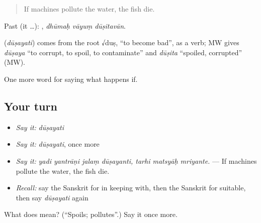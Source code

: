 \begin{quote}
If machines pollute the water, the fish die.
\end{quote}

Past (it …):   , \emph{dhūmaḥ vāyuṃ dūṣitavān}.

\begin{cousinweb}
\textbf{} (\emph{dūṣayati}) comes from the root √duṣ, \textquotedblleft{}to become bad\textquotedblright{}, as a verb; MW gives \emph{dūṣaya} \textquotedblleft{}to corrupt, to spoil, to contaminate\textquotedblright{} and \emph{dūṣita} \textquotedblleft{}spoiled, corrupted\textquotedblright{} (MW).
\end{cousinweb}

\begin{grammarlens}[title={What you've built}]
One more word for saying what happens if.
\end{grammarlens}

\subsection*{Your turn}
\begin{itemize}
\raggedright
  \item \emph{Say it:} \emph{dūṣayati}
  \item \emph{Say it:} \emph{dūṣayati}, once more
  \item \emph{Say it:} \emph{yadi yantrāṇi jalaṃ dūṣayanti, tarhi matsyāḥ mriyante.} — If machines pollute the water, the fish die.
  \item \emph{Recall:} say the Sanskrit for in keeping with, then the Sanskrit for suitable, then say \emph{dūṣayati} again
\end{itemize}

\begin{tcolorbox}[breakable,colback=teal!4,colframe=teal!35!black,title={Before you move on}]
What does  mean? (\textquotedblleft{}Spoils; pollutes\textquotedblright{}.) Say it once more.
\end{tcolorbox}
